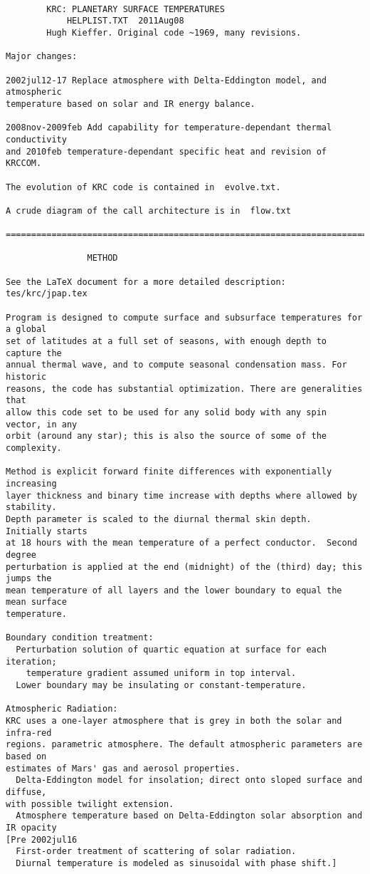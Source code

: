 \begin{verbatim}

 		KRC: PLANETARY SURFACE TEMPERATURES
			HELPLIST.TXT  2011Aug08
        Hugh Kieffer. Original code ~1969, many revisions.

Major changes:

2002jul12-17 Replace atmosphere with Delta-Eddington model, and atmospheric
temperature based on solar and IR energy balance. 

2008nov-2009feb Add capability for temperature-dependant thermal conductivity
and 2010feb temperature-dependant specific heat and revision of KRCCOM.

The evolution of KRC code is contained in  evolve.txt.

A crude diagram of the call architecture is in  flow.txt

================================================================================

				METHOD

See the LaTeX document for a more detailed description: tes/krc/jpap.tex

Program is designed to compute surface and subsurface temperatures for a global
set of latitudes at a full set of seasons, with enough depth to capture the
annual thermal wave, and to compute seasonal condensation mass. For historic
reasons, the code has substantial optimization. There are generalities that
allow this code set to be used for any solid body with any spin vector, in any
orbit (around any star); this is also the source of some of the complexity.
 
Method is explicit forward finite differences with exponentially increasing
layer thickness and binary time increase with depths where allowed by stability.
Depth parameter is scaled to the diurnal thermal skin depth.  Initially starts
at 18 hours with the mean temperature of a perfect conductor.  Second degree
perturbation is applied at the end (midnight) of the (third) day; this jumps the
mean temperature of all layers and the lower boundary to equal the mean surface
temperature.

Boundary condition treatment:
  Perturbation solution of quartic equation at surface for each iteration;
    temperature gradient assumed uniform in top interval.
  Lower boundary may be insulating or constant-temperature.

Atmospheric Radiation:
KRC uses a one-layer atmosphere that is grey in both the solar and infra-red
regions. parametric atmosphere. The default atmospheric parameters are based on
estimates of Mars' gas and aerosol properties.
  Delta-Eddington model for insolation; direct onto sloped surface and diffuse,
with possible twilight extension.
  Atmosphere temperature based on Delta-Eddington solar absorption and IR opacity
[Pre 2002jul16
  First-order treatment of scattering of solar radiation. 
  Diurnal temperature is modeled as sinusoidal with phase shift.]


\end{verbatim}
